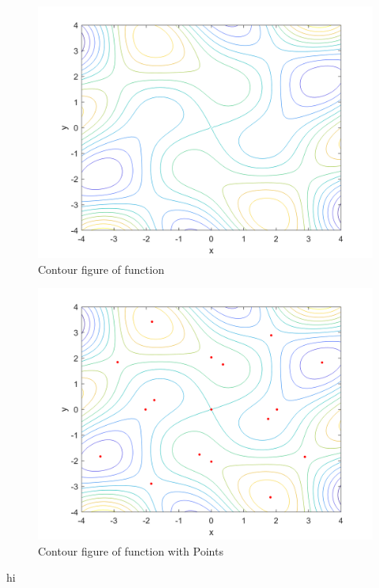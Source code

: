 \begin{figure}[h]
	\caption{Contour figure of function}
	\centering
	\includegraphics{Q1/figures/Contour.png}
\end{figure}
\newpage
\begin{figure}[h]
	\caption{Contour figure of function with Points}
	\centering
	\includegraphics{Q1/figures/ContourWithPoints.png}
\end{figure}
hi
